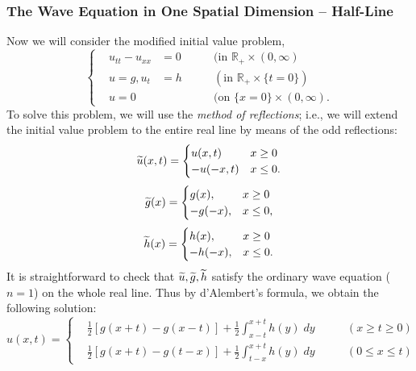 \documentclass{article}
\begin{document}
\subsubsection{The Wave Equation in One Spatial Dimension -- Half-Line}
Now we will consider the modified initial value problem, 
\begin{equation}
	\left\{
	\begin{alignedat}{3}
		&u_{tt} - u_{xx} &=0 &\qquad (\text{in $\mathbb{R}_{+} \times (0, \infty)$} \\
		&u = g, u_{t} &=h &\qquad (\text{in $\mathbb{R}_{+} \times \{t = 0\}$}) \\
		&u = 0 & &\qquad (\text{on $\{x = 0\} \times (0,\infty)$}. 
	\end{alignedat}
	\right.
\end{equation}
To solve this problem, we will use the \textit{method of reflections}; i.e., we will extend the initial value problem to the entire real line by means of the odd reflections: 
\begin{equation*}
	\widetilde{u}(x, t) = 
	\begin{cases}
		u(x, t) & x \geq 0 \\
		-u(-x,t) & x \leq 0.  
	\end{cases}
\end{equation*}
\begin{equation*}
	\widetilde{g}(x) = 
	\begin{cases}
		g(x), & x \geq 0 \\
		-g(-x), & x \leq 0,
	\end{cases}
\end{equation*}
\begin{equation*}
	\widetilde{h}(x) = 
	\begin{cases}
		h(x), & x \geq 0 \\
		-h(-x), & x \leq 0. 
	\end{cases}
\end{equation*}
It is straightforward to check that $\widetilde{u}, \widetilde{g}, \widetilde{h}$ satisfy the ordinary wave equation ($n= 1$) on the whole real line. Thus by d'Alembert's formula, we obtain the following solution: 
\begin{equation}
	\boxed{u(x, t) = 
		\left\{
		\begin{alignedat}{2}
			&\frac{1}{2}[g(x + t) - g(x-t)] + \frac{1}{2}\int_{x -t}^{x + t}h(y)\;dy &\qquad (x\geq t \geq 0)\\
			&\frac{1}{2}[g(x + t) - g(t - x)] + \frac{1}{2}\int_{t - x}^{x + t}h(y)\;dy &\qquad (0 \leq x \leq t)
		\end{alignedat}
		\right.
	}
\end{equation}
\end{document}

